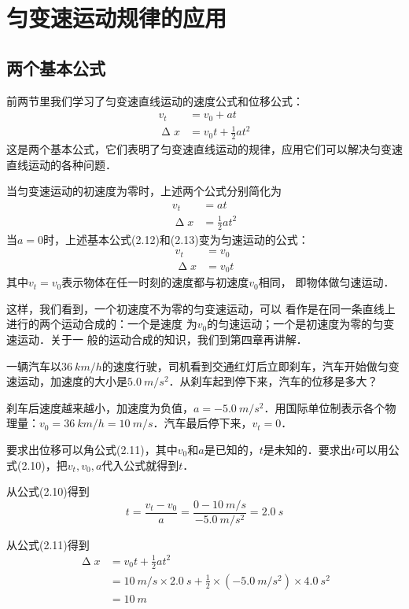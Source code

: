 \newpage

\section{匀变速运动规律的应用}

\subsection{两个基本公式}

前两节里我们学习了匀变速直线运动的速度公式和位移公式：
\begin{align}
    v_t        & =v_0+at                \\
    \upDelta x & =v_0 t+\frac{1}{2}at^2
\end{align}
这是两个基本公式，它们表明了匀变速直线运动的规律，应用它们可以解决匀变速直线运动的各种问题．

当匀变速运动的初速度为零时，上述两个公式分别简化为
\begin{align}
    v_t        & =at              \\
    \upDelta x & =\frac{1}{2}at^2
\end{align}
当$a=0$时，上述基本公式(2.12)和(2.13)变为匀速运动的公式：
\[\begin{split}
        v_t        & =v_0  \\
        \upDelta x & =v_0t
    \end{split}\]
其中$v_t=v_0$表示物体在任一时刻的速度都与初速度$v_0$相同，
即物体做匀速运动．

这样，我们看到，一个初速度不为零的匀变速运动，可以
看作是在同一条直线上进行的两个运动合成的：一个是速度
为$v_0$的匀速运动；一个是初速度为零的匀变速运动．关于一
般的运动合成的知识，我们到第四章再讲解．

\begin{example}
    一辆汽车以$\qty{36}{km/h}$的速度行驶，司机看到交通红灯后立即刹车，汽车开始做匀变速运动，加速度的大小是$\qty{5.0}{m/s^2}$．从刹车起到停下来，汽车的位移是多大？
\end{example}

\begin{solution}
    刹车后速度越来越小，加速度为负值，$a=\qty{-5.0}{m/s^2}$．用国际单位制表示各个物理量：$v_0=\qty{36}{km/h}=\qty{10}{m/s}$．汽车最后停下来，$v_t=0$．

    要求出位移可以角公式(2.11)，其中$v_0$和$a$是已知的，$t$是未知的．要求出$t$可以用公式(2.10)，把$v_t,v_0,a$代入公式就得到$t$．

    从公式(2.10)得到
    \[t=\frac{v_t-v_0}{a}=\frac{0-\qty{10}{m/s}}{\qty{-5.0}{m/s^2}}=\qty{2.0}{s}\]

    从公式(2.11)得到
    \[\begin{split}
            \upDelta x & =v_0t+\frac{1}{2}at^2                                                                          \\
                       & =\qty{10}{m/s} \times \qty{2.0}{s}+\frac{1}{2}\times (\qty{-5.0}{m/s^2}) \times \qty{4.0}{s^2} \\
                       & =\qty{10}{m}
        \end{split} \]
\end{solution}

